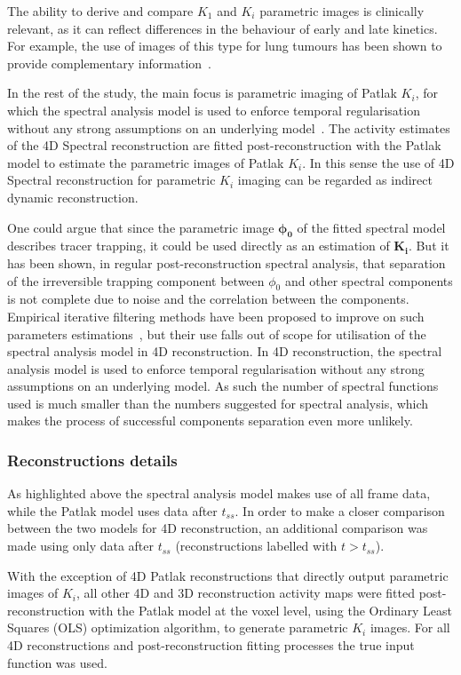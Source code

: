 The ability to derive and compare $K_1$ and $K_i$ parametric images is clinically relevant, as it can reflect differences in the behaviour of early and late kinetics. For example, the use of images of this type for lung tumours has been shown to provide complementary information~\cite{Besson2020}.

In the rest of the study, the main focus is parametric imaging of Patlak ${K_i}$, for which the spectral analysis model is used to enforce temporal regularisation without any strong assumptions on an underlying model~\cite{Reader2007}.
The  activity estimates of the 4D Spectral reconstruction are fitted post-reconstruction with the Patlak model
to estimate the parametric images of Patlak ${K_i}$. 
In this sense the use of 4D Spectral reconstruction for parametric $K_i$ imaging can be regarded as indirect dynamic reconstruction.

One could argue that since the parametric image $\boldsymbol{\phi_0}$  of the fitted spectral model describes tracer trapping, it could be used directly as an estimation of $\boldsymbol{K_i}$. 
But it has been shown, in regular post-reconstruction spectral analysis, that separation of the irreversible trapping component between $\phi_0$ and other spectral components is not complete due to noise and the correlation between the components. Empirical iterative filtering methods have been proposed
to improve on such parameters estimations~\cite{Turkheimer1994,Veronese2010,Veronese2012}, but their use falls out of scope for utilisation of the spectral analysis model in 4D reconstruction.
In 4D reconstruction, the spectral analysis model is used to enforce temporal regularisation without any strong assumptions on an underlying model. As such the number of spectral functions used is much smaller than the numbers suggested for spectral analysis, which makes the process of successful components separation even more unlikely.

\subsubsection{Reconstructions details}

As highlighted above the spectral analysis model makes use of all frame data, while the Patlak model uses data after $t_{ss}$. In order to make a closer comparison between the two models for 4D reconstruction, an additional comparison was made using only data after $t_{ss}$ (reconstructions labelled with $t > t_{ss}$).

With the exception of 4D Patlak reconstructions that directly output parametric images of $K_i$, all other 4D and 3D reconstruction activity maps were fitted post-reconstruction with the Patlak model at the voxel level, using the Ordinary Least Squares (OLS) optimization algorithm, to generate parametric $K_i$ images. For all 4D reconstructions and post-reconstruction fitting processes the true input function was used.

